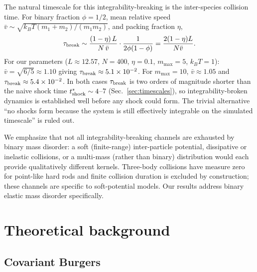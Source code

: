 \documentclass[aps,pre,twocolumn,superscriptaddress,longbibliography,floatfix]{revtex4-2}
\begin{document}
The natural timescale for this integrability-breaking is the
inter-species collision time. For binary fraction $\phi=1/2$,
mean relative speed $\bar v\sim\sqrt{k_B T (m_1+m_2)/(m_1 m_2)}$,
and packing fraction $\eta$,
\begin{equation}
\tau_{\rm break} \sim \frac{(1-\eta)\,L}{N\,\bar v}\cdot
\frac{1}{2\phi(1-\phi)} = \frac{2(1-\eta)L}{N\bar v}.
\label{eq:taubreak}
\end{equation}
For our parameters ($L\approx 12.57$, $N=400$, $\eta=0.1$,
$m_{\max}=5$, $k_B T=1$): $\bar v=\sqrt{6/5}\approx 1.10$
giving $\tau_{\rm break}\approx 5.1\times 10^{-2}$. For
$m_{\max}=10$, $\bar v\approx 1.05$ and
$\tau_{\rm break}\approx 5.4\times 10^{-2}$. In both cases
$\tau_{\rm break}$ is two orders of magnitude shorter than the
naive shock time
$t^*_{\rm shock}\sim 4$--$7$ (Sec.~\ref{sec:timescales}), so
integrability-broken dynamics is established well before any
shock could form. The trivial alternative ``no shocks form
because the system is still effectively integrable on the
simulated timescale'' is ruled out.

We emphasize that not all integrability-breaking channels are
exhausted by binary mass disorder: a soft (finite-range)
inter-particle potential, dissipative or inelastic collisions,
or a multi-mass (rather than binary) distribution would each
provide qualitatively different kernels. Three-body collisions
have measure zero for point-like hard rods and finite collision
duration is excluded by construction; these channels are
specific to soft-potential models. Our results address binary
elastic mass disorder specifically.

\section{Theoretical background}\label{sec:theory}

\subsection{Covariant Burgers}
\end{document}
